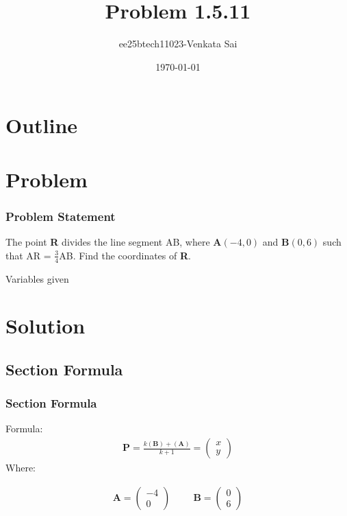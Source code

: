 \documentclass{beamer}
\title{Problem 1.5.11}
\author{ee25btech11023-Venkata Sai}
\date{\today}
\providecommand{\brak}[1]{\ensuremath{\left(#1\right)}}
\theoremstyle{remark}
\newcommand{\myvec}[1]{\ensuremath{\begin{pmatrix}#1\end{pmatrix}}}
\let\vec\mathbf
\numberwithin{equation}{section}
\begin{document}
\begin{frame}
\titlepage
\end{frame}

\section*{Outline}
\begin{frame}
\tableofcontents
\end{frame}
\section{Problem}
\begin{frame}
\frametitle{Problem Statement}
%
 The point \textbf{R} divides the line segment AB, where \textbf{A}$\brak{-4,0}$ and \textbf{B}$\brak{0,6}$ such that
AR = $\frac{3}{4}$AB. Find the coordinates of \textbf{R}. 
 \begin{table}[h!]    
  \centering
  
  \caption{Variables given}
  \label{tab 1.4.9.2}
\end{table}
\end{frame}

\section{Solution}
\subsection{Section Formula}
\begin{frame}
\frametitle{Section Formula}
Formula:
\begin{align}
\vec{P}=\frac{k(\vec{B})+(\vec{A})}{k+1}=\myvec{x\\y}
\end{align}
Where: 


\begin{align}
\vec{A}=\myvec{-4\\0} \hspace{1cm} \vec{B}=\myvec{0\\6} 
\end{align}


\end{frame}
\end{document}
